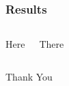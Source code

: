 \documentclass{beamer}
\begin{document}

\begin{frame}
\frametitle{Results}
\begin{columns}[c] %

Here

There

\end{columns}
\end{frame}




\begin{frame}
\Huge{\centerline{Thank You}}
\end{frame}

\end{document}
